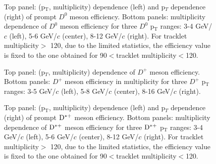 \begin{figure}[!htp]
	\centering
\caption{Top panel: (p$_\mathrm{T}$, multiplicity) dependence (left) and p$_T$ dependence (right) of prompt $D^0$ meson efficiency. Bottom panels: multiplicity dependence of $D^0$ meson efficiency for three $D^0$ p$_\mathrm{T}$ ranges: 3-4 GeV/$c$ (left), 5-6 GeV/$c$ (center), 8-12 GeV/$c$ (right). For tracklet multiplicity$>$ 120, due to the limited statistics, the efficiency value is fixed to the one obtained for 90$<$tracklet multiplicity$<$120.}
	\label{fig:d0eff}	
\end{figure}

\begin{figure}[h]
	\centering
	\caption{Top panel: (p$_T$, multiplicity) dependence of $D^+$ meson efficiency. Bottom panels: $D^+$ meson efficiency in multiplicity for three $D^+$ p$_\mathrm{T}$ranges: 3-5 GeV/$c$ (left), 5-8 GeV/$c$ (center), 8-16 GeV/$c$ (right).}
	\label{fig:dpluseff}	
\end{figure}

\begin{figure}[!htp]
	\centering
\caption{Top panel: (p$_\mathrm{T}$, multiplicity) dependence (left) and p$_T$ dependence (right) of prompt ${\rm D^{*+}}$ meson efficiency. Bottom panels: multiplicity dependence of ${\rm D^{*+}}$ meson efficiency for three ${\rm D^{*+}}$ p$_\mathrm{T}$ ranges: 3-4 GeV/$c$ (left), 5-6 GeV/$c$ (center), 8-12 GeV/$c$ (right). For tracklet multiplicity$>$ 120, due to the limited statistics, the efficiency value is fixed to the one obtained for 90$<$tracklet multiplicity$<$120.}
	\label{fig:dstareff}	
\end{figure}
\newpage 
